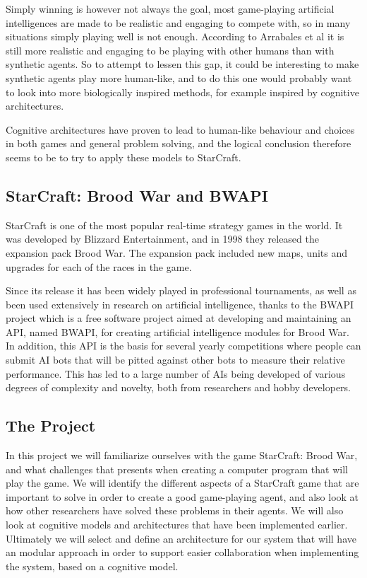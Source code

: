Simply winning is however not always the goal, most game-playing artificial
intelligences are made to be realistic and engaging to compete with, so in many
situations simply playing well is not enough. According to Arrabales et
al \cite{arrabales2009gamechars} it is still more realistic and engaging to be
playing with other humans than with synthetic agents. So to attempt to lessen
this gap, it could be interesting to make synthetic agents play more human-like,
and to do this one would probably want to look into more biologically inspired
methods, for example inspired by cognitive architectures.

Cognitive architectures have proven to lead to human-like behaviour and choices
in both games\cite{arrabales2009gamechars} and general problem
solving\cite{franklin2003interacting}, and the logical conclusion therefore
seems to be to try to apply these models to StarCraft.

\subsection{StarCraft: Brood War and BWAPI}
\label{sec:scbw}
StarCraft is one of the most popular real-time strategy games in the world. It
was developed by Blizzard Entertainment, and in 1998 they released the expansion
pack Brood War. The expansion pack included new maps, units and upgrades for
each of the races in the game.
 
Since its release it has been widely played in professional tournaments, as well
as been used extensively in research on artificial intelligence, thanks to the
BWAPI project which is a free software project aimed at developing and
maintaining an API, named BWAPI, for creating artificial intelligence modules
for Brood War. In addition, this API is the basis for several yearly
competitions where people can submit AI bots that will be pitted against other
bots to measure their relative performance. This has led to a large number of
AIs being developed of various degrees of complexity and novelty, both from
researchers and hobby developers. 

\subsection{The Project}
\label{sec:project}
In this project we will familiarize ourselves with the game StarCraft: Brood
War, and what challenges that presents when creating a computer program that
will play the game. We will identify the different aspects of a StarCraft game
that are important to solve in order to create a good game-playing agent, and
also look at how other researchers have solved these problems in their agents.
We will also look at cognitive models and architectures that have been
implemented earlier. Ultimately we will select and define an architecture for
our system that will have an modular approach in order to support easier
collaboration when implementing the system, based on a cognitive model.

